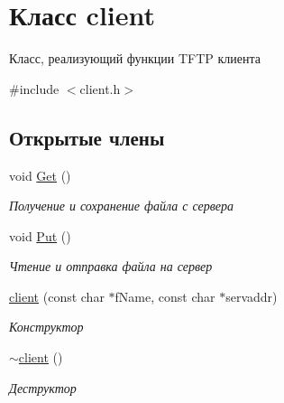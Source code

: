 \hypertarget{classclient}{}\section{Класс client}
\label{classclient}


Класс, реализующий функции T\+F\+TP клиента  




{\ttfamily \#include $<$client.\+h$>$}

\subsection*{Открытые члены}
\begin{DoxyCompactItemize}
\item 
void \mbox{\hyperlink{classclient_a204a854c2b58979e60e09aff8106fe8f}{Get}} ()
\begin{DoxyCompactList}\small\item\em Получение и сохранение файла с сервера \end{DoxyCompactList}\item 
void \mbox{\hyperlink{classclient_a79b042ca6412a9dbe2aa6fc7e2c84fd6}{Put}} ()
\begin{DoxyCompactList}\small\item\em Чтение и отправка файла на сервер \end{DoxyCompactList}\item 
\mbox{\hyperlink{classclient_a4bc79734708aae7d9017d03a62b5d324}{client}} (const char $\ast$f\+Name, const char $\ast$servaddr)
\begin{DoxyCompactList}\small\item\em Конструктор \end{DoxyCompactList}\item 
\mbox{\hyperlink{classclient_ad45e388579b8c0ffec6f29ed2c0c4de9}{$\sim$client}} ()
\begin{DoxyCompactList}\small\item\em Деструктор \end{DoxyCompactList}\end{DoxyCompactItemize}
